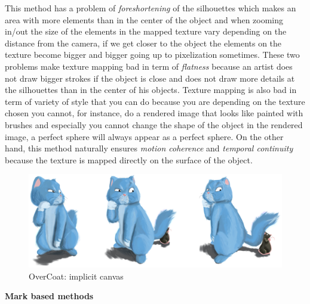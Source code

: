 This method has a problem of \textit{foreshortening} of the silhouettes which makes an area with more elements than in the center of the object and when zooming in/out the size of the elements in the mapped texture vary depending on the distance from the camera, if we get closer to the object the elements on the texture become bigger and bigger going up to pixelization sometimes. These two problems make texture mapping bad in term of \textit{flatness} because an artist does not draw bigger strokes if the object is close and does not draw more details at the silhouettes than in the center of his objects. Texture mapping is also bad in term of variety of style that you can do because you are depending on the texture chosen you cannot, for instance, do a rendered image that looks like painted with brushes and especially you cannot change the shape of the object in the rendered image, a perfect sphere will always appear as a perfect sphere. On the other hand, this method naturally ensures \textit{motion coherence} and \textit{temporal continuity} because the texture is mapped directly on the surface of the object. \newline




\begin{figure}
    \begin{center}

    \includegraphics[scale=0.5]{images/overcoat.jpg}
    \end{center}
    \caption{OverCoat: implicit canvas \cite{schmid_overcoat:_2011}}
    \label{overcoat_figure}
\end{figure}

\textbf{Mark based methods}

